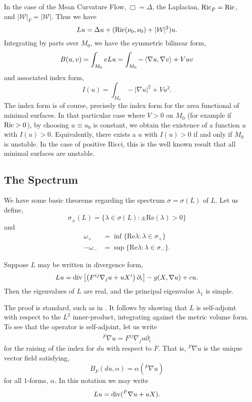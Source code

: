 \documentclass{amsart}
\begin{document}
\begin{rem}
In the case of the Mean Curvature Flow, \(\Box = \Delta\), the Laplacian, \(\operatorname{Ric}_{\dot{F}} = \operatorname{Ric}\), and \(|\mathcal{W}|_{\dot{F}} = |\mathcal{W}|\). Thus we have
\[
L u = \Delta u + (\operatorname{Ric}(\nu_0, \nu_0) + |\mathcal{W}|^2) u.
\]
Integrating by parts over \(M_0\), we have the symmetric bilinear form,
\[
B(u, v) = \int_{M_0} v Lu = \int_{M_0} -\left\langle \nabla u,\nabla v \right\rangle + V uv 
\]
and associated index form,
\[
I(u) = \int_{M_0} -|\nabla u|^2 + V u^2.
\]
The index form is of course, precisely the index form for the area functional of minimal surfaces. In that particular case where \(V > 0\) on \(M_0\) (for example if \(\operatorname{Ric} > 0\)), by choosing \(u \equiv u_0\) is constant, we obtain the existence of a function \(u\) with \(I(u) > 0\). Equivalently, there exists a \(u\) with \(I(u) > 0\) if and only if \(M_0\) is unstable. In the case of positive Ricci, this is the well known result that all minimal surfaces are unstable.
\end{rem}

\subsection{The Spectrum}
\label{subsec:spectrum}

We have some basic theorems regarding the spectrum \(\sigma = \sigma(L)\) of \(L\). Let us define,
\[
\sigma_{\pm} (L) = \{\lambda \in \sigma(L) : \pm \text{Re}(\lambda) > 0\}
\]
and
\begin{align*}
\omega_+ &= \inf \{\text{Re} \lambda : \lambda \in \sigma_+\} \\
- \omega_- &= \sup \{\text{Re} \lambda : \lambda \in \sigma_-\}.
\end{align*}

\begin{thm}
Suppose \(L\) may be written in divergence form,
\[
L u = \operatorname{div}\left[\left(F^{ij} \nabla_j u + u X^i\right)\partial_i\right] - g(X, \nabla u) + c u.
\]
Then the eigenvalues of \(L\) are real, and the principal eigenvalue \(\lambda_1\) is simple.
\end{thm}

The proof is standard, such as in \cite[Theorems 8.37, 8.38]{GilbargTrudinger:/2001}. It follows by showing that \(L\) is self-adjoint with respect to the \(L^2\) inner-product, integrating against the metric volume form. To see that the operator is self-adjoint, let us write
\[
^{\dot{F}}\nabla u = \dot{F^{ij}} \nabla_j u \partial_i
\]
for the raising of the index for \(du\) with respect to \(\dot{F}\). That is, \(^{\dot{F}} \nabla u\) is the unique vector field satisfying,
\[
B_{\dot{F}} (du, \alpha) = \alpha(^{\dot{F}}\nabla u)
\]
for all \(1\)-forms, \(\alpha\). In this notation we may write
\[
L u = \operatorname{div}(^{\dot{F}}\nabla u + u X).
\]
\end{document}
